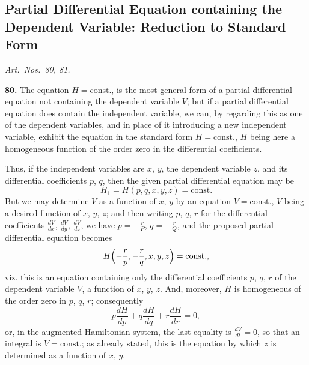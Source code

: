 \documentclass[11pt,a4paper]{article}
\theoremstyle{plain}
\theoremstyle{definition}
\begin{document}
\medskip

\subsection*{Partial Differential Equation containing the Dependent Variable: Reduction to Standard Form}
\textit{Art.~Nos.~80, 81.}

\smallskip

\noindent\textbf{80.} The equation $H = \text{const.}$, is the most general form of a partial differential equation not containing the dependent variable $V$; but if a partial differential equation does contain the independent variable, we can, by regarding this as one of the dependent variables, and in place of it introducing a new independent variable, exhibit the equation in the standard form $H = \text{const.}$, $H$ being here a homogeneous function of the order zero in the differential coefficients.

Thus, if the independent variables are $x$, $y$, the dependent variable $z$, and its differential coefficients $p$, $q$, then the given partial differential equation may be
\[
H_1 = H(p, q, x, y, z) = \text{const.}
\]
But we may determine $V$ as a function of $x$, $y$ by an equation $V = \text{const.}$, $V$ being a desired function of $x$, $y$, $z$; and then writing $p$, $q$, $r$ for the differential coefficients $\frac{dV}{dx}$, $\frac{dV}{dy}$, $\frac{dV}{dz}$, we have $p = -\frac{r}{P}$, $q = -\frac{r}{Q}$, and the proposed partial differential equation becomes
\[
H\Bigl(-\frac{r}{p}, -\frac{r}{q}, x, y, z\Bigr) = \text{const.},
\]
viz. this is an equation containing only the differential coefficients $p$, $q$, $r$ of the dependent variable $V$, a function of $x$, $y$, $z$. And, moreover, $H$ is homogeneous of the order zero in $p$, $q$, $r$; consequently
\[
p\frac{dH}{dp} + q\frac{dH}{dq} + r\frac{dH}{dr} = 0,
\]
or, in the augmented Hamiltonian system, the last equality is $\frac{dV}{dt} = 0$, so that an integral is $V = \text{const.}$; as already stated, this is the equation by which $z$ is determined as a function of $x$, $y$.

\smallskip
\end{document}
